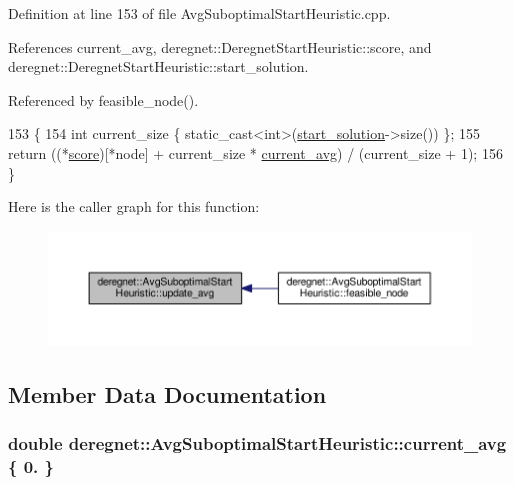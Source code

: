 Definition at line 153 of file Avg\+Suboptimal\+Start\+Heuristic.\+cpp.



References current\+\_\+avg, deregnet\+::\+Deregnet\+Start\+Heuristic\+::score, and deregnet\+::\+Deregnet\+Start\+Heuristic\+::start\+\_\+solution.



Referenced by feasible\+\_\+node().


\begin{DoxyCode}
153                                                          \{
154     \textcolor{keywordtype}{int} current\_size \{ \textcolor{keyword}{static\_cast<}\textcolor{keywordtype}{int}\textcolor{keyword}{>}(\hyperlink{classderegnet_1_1DeregnetStartHeuristic_a7450e11ca0a265b055f95e7832b65e2f}{start\_solution}->size()) \};
155     \textcolor{keywordflow}{return} ((*\hyperlink{classderegnet_1_1DeregnetStartHeuristic_ae03300e79482975e98f95cba19ad32b0}{score})[*node] + current\_size * \hyperlink{classderegnet_1_1AvgSuboptimalStartHeuristic_a5c07fde8d2f92daeb4cc33f85e8bf1e2}{current\_avg}) / (current\_size + 1);
156 \}
\end{DoxyCode}


Here is the caller graph for this function\+:\nopagebreak
\begin{figure}[H]
\begin{center}
\leavevmode
\includegraphics[width=350pt]{classderegnet_1_1AvgSuboptimalStartHeuristic_a29659ab4864fddd2c226da7e1ada22ef_icgraph}
\end{center}
\end{figure}




\subsection{Member Data Documentation}
\subsubsection[{\texorpdfstring{current\+\_\+avg}{current_avg}}]{\setlength{\rightskip}{0pt plus 5cm}double deregnet\+::\+Avg\+Suboptimal\+Start\+Heuristic\+::current\+\_\+avg \{ 0. \}\hspace{0.3cm}{\ttfamily [private]}}\hypertarget{classderegnet_1_1AvgSuboptimalStartHeuristic_a5c07fde8d2f92daeb4cc33f85e8bf1e2}{}\label{classderegnet_1_1AvgSuboptimalStartHeuristic_a5c07fde8d2f92daeb4cc33f85e8bf1e2}


